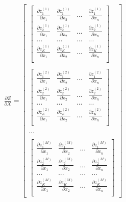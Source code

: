 \documentclass[UTF8]{article}
\begin{document}
\begin{equation}
\begin{aligned}
\frac{\partial{Z}}{\partial{X}}=\begin{bmatrix}
\begin{bmatrix}
 \frac{\partial{z_{1}^{(1)}}}{\partial{x_{1}}} & \frac{\partial{z_{1}^{(1)}}}{\partial{x_{2}}} & ... & \frac{\partial{z_{1}^{(1)}}}{\partial{x_{n}}} \\
 \frac{\partial{z_{2}^{(1)}}}{\partial{x_{1}}} & \frac{\partial{z_{2}^{(1)}}}{\partial{x_{2}}} & ... & \frac{\partial{z_{2}^{(1)}}}{\partial{x_{n}}} \\
 ... & ... & ... & ... \\
 \frac{\partial{z_{K}^{(1)}}}{\partial{x_{1}}} & \frac{\partial{z_{K}^{(1)}}}{\partial{x_{2}}} & ... & \frac{\partial{z_{K}^{(1)}}}{\partial{x_{n}}} \\
 \end{bmatrix} \\ \\
 \begin{bmatrix}
 \frac{\partial{z_{1}^{(2)}}}{\partial{x_{1}}} & \frac{\partial{z_{1}^{(2)}}}{\partial{x_{2}}} & ... & \frac{\partial{z_{1}^{(2)}}}{\partial{x_{n}}} \\
 \frac{\partial{z_{2}^{(2)}}}{\partial{x_{1}}} & \frac{\partial{z_{2}^{(2)}}}{\partial{x_{2}}} & ... & \frac{\partial{z_{2}^{(2)}}}{\partial{x_{n}}} \\
 ... & ... & ... & ... \\
 \frac{\partial{z_{K}^{(2)}}}{\partial{x_{1}}} & \frac{\partial{z_{K}^{(2)}}}{\partial{x_{2}}} & ... & \frac{\partial{z_{K}^{(2)}}}{\partial{x_{n}}} \\
 \end{bmatrix} \\ \\
 ... \\ \\
 \begin{bmatrix}
 \frac{\partial{z_{1}^{(M)}}}{\partial{x_{1}}} & \frac{\partial{z_{1}^{(M)}}}{\partial{x_{2}}} & ... & \frac{\partial{z_{1}^{(M)}}}{\partial{x_{n}}} \\
 \frac{\partial{z_{2}^{(M)}}}{\partial{x_{1}}} & \frac{\partial{z_{2}^{(M)}}}{\partial{x_{2}}} & ... & \frac{\partial{z_{2}^{(M)}}}{\partial{x_{n}}} \\
 ... & ... & ... & ... \\
 \frac{\partial{z_{K}^{(M)}}}{\partial{x_{1}}} & \frac{\partial{z_{K}^{(M)}}}{\partial{x_{2}}} & ... & \frac{\partial{z_{K}^{(M)}}}{\partial{x_{n}}} \\

\end{bmatrix}
\end{bmatrix}
\end{aligned}
\end{equation}
\end{document}
